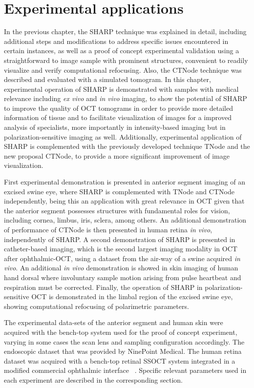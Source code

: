 \newpage
{}
\chapter{Experimental applications}\label{chap:results}

In the previous chapter, the SHARP technique was explained in detail, including additional steps and modifications to address specific issues encountered in certain instances, as well as a proof of concept experimental validation using a straightforward to image sample with prominent structures, convenient to readily visualize and verify computational refocusing. Also, the CTNode technique was described and evaluated with a simulated tomogram.  In this chapter, experimental operation of SHARP is demonstrated with samples with medical relevance including \textit{ex vivo} and \textit{in vivo} imaging, to show the potential of SHARP to improve the quality of OCT tomograms in order to provide more detailed information of tissue and to facilitate visualization of images for a improved analysis of specialists, more importantly in intensity-based imaging but in polarization-sensitive imaging as well. Additionally, experimental application of SHARP is complemented with the previously developed technique TNode and the new proposal CTNode, to provide a more significant improvement of image visualization.

First experimental demonstration is presented in anterior segment imaging of an excised swine eye, where SHARP is complemented with TNode and CTNode independently, being this an application with great relevance in OCT given that the anterior segment possesses structures with fundamental roles for vision, including cornea, limbus, iris, sclera, among others. An additional demonstration of performance of CTNode is then presented in human retina \textit{in vivo}, independently of SHARP.  A second demonstration of SHARP is presented in catheter-based imaging, which is the second largest imaging modality in OCT after ophthalmic-OCT, using a dataset from the air-way of a swine acquired \textit{in vivo}. An additional \textit{in vivo} demonstration is showed in skin imaging of human hand dorsal where involuntary sample motion arising from pulse heartbeat and respiration must be corrected. Finally, the operation of SHARP in polarization-sensitive OCT is demonstrated in the limbal region of the excised swine eye, showing computational refocusing of polarimetric parameters.

The experimental data-sets of the anterior segment and human skin were acquired with the bench-top system used for the proof of concept experiment, varying in some cases the scan lens and sampling configuration accordingly. The endoscopic dataset that was provided by NinePoint Medical. The human retina dataset was acquired with a bench-top retinal SSOCT system integrated in a modified commercial ophthalmic interface~\cite{Braaf2018_Complex} . Specific relevant parameters used in each experiment are described in the corresponding section.

